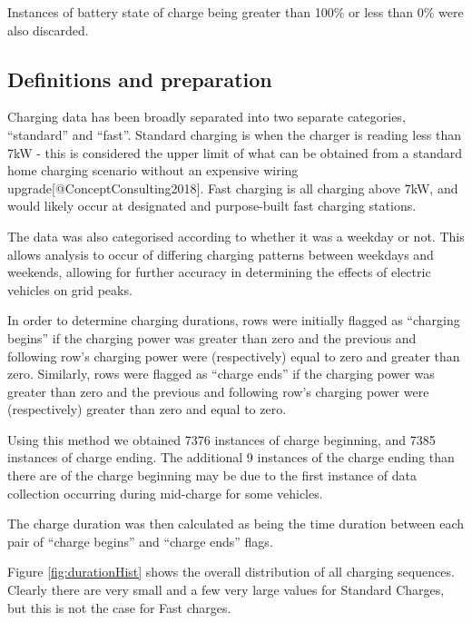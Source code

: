 \documentclass[]{article}
\begin{document}
Instances of battery state of charge being greater than 100\% or less
than 0\% were also discarded.

\subsection{Definitions and preparation}\label{cleaning}

Charging data has been broadly separated into two separate categories,
``standard'' and ``fast''. Standard charging is when the charger is
reading less than 7kW - this is considered the upper limit of what can
be obtained from a standard home charging scenario without an expensive
wiring upgrade{[}@ConceptConsulting2018{]}. Fast charging is all
charging above 7kW, and would likely occur at designated and
purpose-built fast charging stations.

The data was also categorised according to whether it was a weekday or
not. This allows analysis to occur of differing charging patterns
between weekdays and weekends, allowing for further accuracy in
determining the effects of electric vehicles on grid peaks.

In order to determine charging durations, rows were initially flagged as
``charging begins'' if the charging power was greater than zero and the
previous and following row's charging power were (respectively) equal to
zero and greater than zero. Similarly, rows were flagged as ``charge
ends'' if the charging power was greater than zero and the previous and
following row's charging power were (respectively) greater than zero and
equal to zero.

Using this method we obtained 7376 instances of charge beginning, and
7385 instances of charge ending. The additional 9 instances of the
charge ending than there are of the charge beginning may be due to the
first instance of data collection occurring during mid-charge for some
vehicles.

The charge duration was then calculated as being the time duration
between each pair of ``charge begins'' and ``charge ends'' flags.

Figure \ref{fig:durationHist} shows the overall distribution of all
charging sequences. Clearly there are very small and a few very large
values for Standard Charges, but this is not the case for Fast charges.
\end{document}

